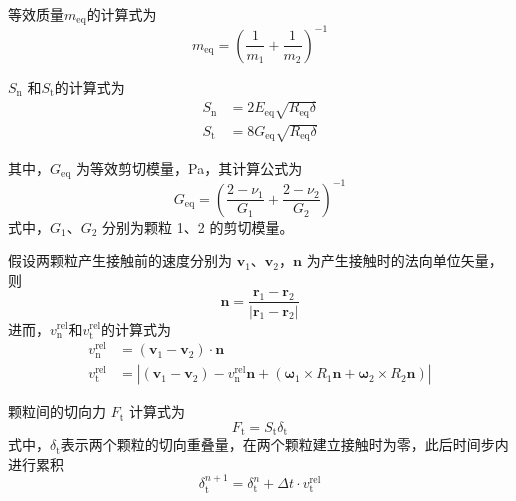 等效质量\(m_\mathrm{eq}\)的计算式为
\begin{equation}
	m_{\mathrm{eq}} = \left(\frac{1}{m_{1}}+\frac{1}{m_{2}}\right)^{-1}	
\end{equation}

\(S_{\mathrm{n}}\) 和\(S_{\mathrm{t}}\)的计算式为
\begin{equation}
	\begin{aligned}
		S_{\mathrm{n}} &= 2E_{\mathrm{eq}}\sqrt{R_{\mathrm{eq}}\delta}\\
		S_{\mathrm{t}} &= 8G_{\mathrm{eq}}\sqrt{R_{\mathrm{eq}}\delta}
	\end{aligned}
\end{equation}

其中，\(G_{\mathrm{eq}}\) 为等效剪切模量，Pa，其计算公式为
\begin{equation}
	G_{\mathrm{eq}}=\left(\frac{2-\nu_{1}}{G_{1}}+\frac{2-\nu_{2}}{G_{2}}\right)^{-1}
\end{equation}
式中，\(G_{1}\)、\(G_{2}\) 分别为颗粒 1、2 的剪切模量。

假设两颗粒产生接触前的速度分别为 \(\bm{v}_{1}\)、\(\bm{v}_{2}\)，\(\bm{n}\) 为产生接触时的法向单位矢量，则
\begin{equation}
		\bm{n}=\frac{\bm{r}_{1}-\bm{r}_{2}}{\left|\bm{r}_{1}-\bm{r}_{2}\right|}
\end{equation}
进而，\(v_{\mathrm{n}}^{\mathrm{rel}}\)和\(v_{\mathrm{t}}^{\mathrm{rel}}\)的计算式为
\begin{equation}
	\begin{aligned}
	v_{\mathrm{n}}^{\mathrm{rel}} &= (\bm{v}_{1}-\bm{v}_{2})\cdot\bm{n} \\
	v_{\mathrm{t}}^{\mathrm{rel}} &= \left|(\bm{v}_{1}-\bm{v}_{2}) - v_{\mathrm{n}}^{\mathrm{rel}}\bm{n} + (\bm{\omega}_{1} \times R_1\bm{n} + \bm{\omega}_{2} \times R_2\bm{n})\right|
	\end{aligned}
\end{equation}

颗粒间的切向力 \(F_{\mathrm{t}}\) 计算式为
\begin{equation}
	F_{\mathrm{t}}=S_{\mathrm{t}}\delta_{\mathrm{t}}
	\label{eq:shear_damping_force}
\end{equation}
式中，\(\delta_{\mathrm{t}}\)表示两个颗粒的切向重叠量，在两个颗粒建立接触时为零，此后时间步内进行累积
\begin{equation}
	\delta_{\mathrm{t}}^{n+1} = \delta_{\mathrm{t}}^{n} + \Delta t \cdot {v}_\mathrm{t}^\mathrm{rel}
\end{equation}

